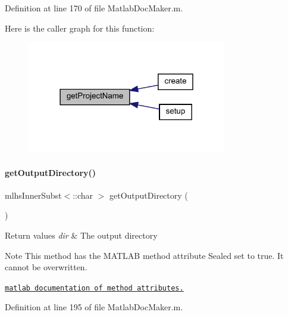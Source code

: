 Definition at line 170 of file Matlab\+Doc\+Maker.\+m.

Here is the caller graph for this function\+:\nopagebreak
\begin{figure}[H]
\begin{center}
\leavevmode
\includegraphics[width=247pt]{class_matlab_doc_maker_af8bd1d74d403b7e81831a0b0f7351e72_icgraph}
\end{center}
\end{figure}
\mbox{\label{class_matlab_doc_maker_a8a464e2b3bd76625f637dedbedbd1ea0}} 
\paragraph{\texorpdfstring{get\+Output\+Directory()}{getOutputDirectory()}}
{\footnotesize\ttfamily mlhs\+Inner\+Subst$<$\+::char $>$ get\+Output\+Directory (\begin{DoxyParamCaption}{ }\end{DoxyParamCaption})\hspace{0.3cm}{\ttfamily [static]}}


\begin{DoxyRetVals}{Return values}
{\em dir} & The output directory\\
\hline
\end{DoxyRetVals}
\begin{DoxyNote}{Note}
This method has the M\+A\+T\+L\+AB method attribute {\ttfamily Sealed} set to true. It cannot be overwritten. 

\href{http://www.mathworks.com/help/matlab/matlab_oop/method-attributes.html}{\tt matlab documentation of method attributes.} 
\end{DoxyNote}


Definition at line 195 of file Matlab\+Doc\+Maker.\+m.

